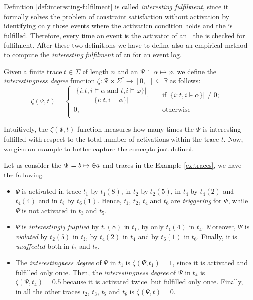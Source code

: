 Definition \ref{def:interesting-fulfilment} is called \textit{interesting fulfilment}, since it formally solves the problem of constraint satisfaction without activation by identifying only those events where the activation condition holds and the \rcon\xspace is fulfilled. Therefore, every time an event is the activator of an \rcon, the \rcon\xspace is checked for fulfilment.
After these two definitions we have to define also an empirical method to compute the \textit{interesting fulfilment} of an \rcon\xspace for an event log.

\begin{definition}\citep{cecconi2018interestingness}\label{def:interestingness-degree}
Given a finite trace $t \in \Sigma$ of length $n$ and an \rcon\xspace $\Psi \doteq \alpha  \mapsto \varphi$, we define the \emph{interestingness degree} function $\zeta: \mathcal{R} \times \Sigma^* \rightarrow [0,1] \subseteq \mathbb{R}$ as follows:
\[   
\zeta(\Psi,t) = 
     \begin{cases}
       \dfrac{\lvert \{ i: t,i \models \alpha \text{ and } t,i \models \varphi\} \rvert}{\lvert \{ i: t,i \models \alpha\} \rvert}, &\quad\text{if } \lvert \{ i: t,i \models \alpha\} \rvert \neq 0 ;\\
       0, &\quad\text{otherwise} \\
     \end{cases}
\]
\end{definition}
Intuitively, the $\zeta(\Psi, t)$ function measures how many times the \rcon\xspace $\Psi$ is interesting fulfilled with respect to the total number of activations within the trace $t$. Now, we give an example to better capture the concepts just defined.

\begin{example}\label{ex:janus-interest}
Let us consider the \rcon\xspace $\Psi = b \mapsto \Once a$ and traces in the Example \ref{ex:traces}, we have the following:
\begin{itemize}
\item $\Psi$ is activated in trace $t_1$ by $t_1(8)$, in $t_2$ by $t_2(5)$, in $t_4$ by $t_4(2)$ and $t_4(4)$ and in $t_6$ by $t_6(1)$. Hence, $t_1$, $t_2$, $t_4$ and $t_6$ are \textit{triggering} for $\Psi$, while $\Psi$ is not activated in $t_3$ and $t_5$.
\item $\Psi$ is \textit{interestingly fulfilled} by $t_1(8)$ in $t_1$, by only $t_4(4)$ in $t_4$. Moreover, $\Psi$ is \textit{violated} by $t_2(5)$ in $t_2$, by $t_4(2)$ in $t_4$ and by $t_6(1)$ in $t_6$. Finally, it is \textit{unaffected} both in $t_3$ and $t_5$. 
\item The \textit{interestingness degree} of $\Psi$ in $t_1$ is $\zeta(\Psi, t_1) = 1$, since it is activated and fulfilled only once. Then, the \textit{interestingness degree} of $\Psi$ in $t_4$ is $\zeta(\Psi, t_4) = 0.5$ because it is activated twice, but fulfilled only once. Finally, in all the other traces $t_2$, $t_3$, $t_5$ and $t_6$ is $\zeta(\Psi, t) = 0$.
\end{itemize}
\end{example}

